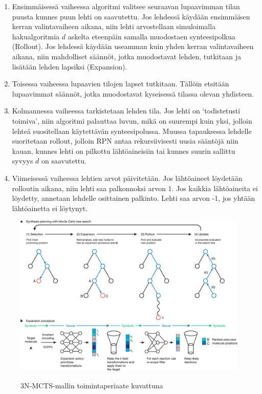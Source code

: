 \documentclass[finnish,twoside,censored,tkt,sw-line]{HYthesisML}
\begin{document}
\begin{enumerate}
    \item Ensimmäisessä vaiheessa algoritmi valitsee seuraavan lupaavimman tilan puusta kunnes puun lehti on saavutettu.
          Jos lehdessä käydään ensimmäisen kerran valintavaiheen aikana, niin lehti arvostellaan simuloimalla hakualgoritmia \(d\) askelta eteenpäin samalla muodostaen synteesipolkua (Rollout).
          Jos lehdessä käydään useamman kuin yhden kerran valintavaiheen aikana, niin mahdolliset säännöt, jotka muodostavat lehden, tutkitaan ja lisätään lehden lapsiksi (Expansion).

    \item Toisessa vaiheessa lupaavien tilojen lapset tutkitaan.
          Tällöin etsitään lupaavimmat säännöt, jotka muodostavat kyseisessä tilassa olevan yhdisteen.

    \item Kolmannessa vaiheessa tarkistetaan lehden tila.
          Jos lehti on `todistetusti toimiva', niin algoritmi palauttaa luvun, mikä on suurempi kuin yksi, jolloin lehteä suositellaan käytettävän synteesipolussa.
          Muussa tapauksessa lehdelle suoritetaan rollout, jolloin RPN antaa rekursiivisesti uusia sääntöjä niin kauan, kunnes lehti on pilkottu lähtöaineisiin tai kunnes suurin sallittu syvyys \(d\) on saavutettu.

    \item Viimeisessä vaiheessa lehtien arvot päivitetään.
          Jos lähtöaineet löydetään rolloutin aikana, niin lehti saa palkonnoksi arvon 1.
          Jos kaikkia lähtöaineita ei löydetty, annetaan lehdelle osittainen palkinto.
          Lehti saa arvon -1, jos yhtään lähtöainetta ei löytynyt.
\end{enumerate}

\begin{figure}[!ht]
    \centering
    \includegraphics[width=\textwidth]{3N-MCTS-fig.jpg}
    \caption{3N-MCTS-mallin toimintaperiaate kuvattuna}
    {\cite{SeglerMarwinHS2018Pcsw}}
    {\label{fig:3n-mcts-model}}
\end{figure}
\end{document}

